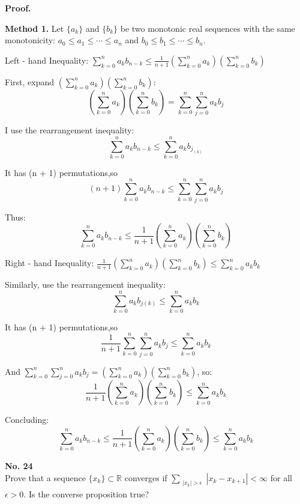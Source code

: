 \documentclass[a4paper, 11pt]{article}
\newenvironment{problem}[2][No.]
    { \begin{mdframed}[backgroundcolor=gray!5] \textbf{#1 #2} \\}
    {  \end{mdframed}}
\newenvironment{solution}
    {\textbf{Proof.}}
    {}
\begin{document}
\begin{solution}

\textbf{Method 1.} 
Let \(\{a_k\}\) and \(\{b_k\}\) be two monotonic real sequences with the same monotonicity: \(a_0\leq a_1\leq\cdots\leq a_n\) and \(b_0\leq b_1\leq\cdots\leq b_n\).  

Left - hand Inequality: \(\sum_{k = 0}^{n}a_k b_{n - k}\leq\frac{1}{n + 1}\left(\sum_{k = 0}^{n}a_k\right)\left(\sum_{k = 0}^{n}b_k\right)\) 
 
First, expand \(\left(\sum_{k = 0}^{n}a_k\right)\left(\sum_{k = 0}^{n}b_k\right)\):  
$$
\left(\sum_{k = 0}^{n}a_k\right)\left(\sum_{k = 0}^{n}b_k\right)=\sum_{k = 0}^{n}\sum_{j = 0}^{n}a_k b_j
$$ 

I use the rearrangement inequality:  
$$
\sum_{k = 0}^{n}a_k b_{n - k}\leq\sum_{k = 0}^{n}a_k b_{j_(k)}
$$

It has (n + 1) permutations,so 
$$
(n + 1)\sum_{k = 0}^{n}a_k b_{n - k}\leq\sum_{k = 0}^{n}\sum_{j = 0}^{n}a_k b_j
$$  

Thus:  
$$
\sum_{k = 0}^{n}a_k b_{n - k}\leq\frac{1}{n + 1}\left(\sum_{k = 0}^{n}a_k\right)\left(\sum_{k = 0}^{n}b_k\right)
$$  

Right - hand Inequality: \(\frac{1}{n + 1}\left(\sum_{k = 0}^{n}a_k\right)\left(\sum_{k = 0}^{n}b_k\right)\leq\sum_{k = 0}^{n}a_k b_k\)  

Similarly, use the rearrangement inequality:   
$$
\sum_{k = 0}^{n}a_k b_{j(k)}\leq\sum_{k = 0}^{n}a_k b_k
$$  

It has (n + 1) permutations,so 
$$
\frac{1}{n + 1}\sum_{k = 0}^{n}\sum_{j = 0}^{n}a_k b_j\leq\sum_{k = 0}^{n}a_k b_k
$$

And \(\sum_{k = 0}^{n}\sum_{j = 0}^{n}a_k b_j=\left(\sum_{k = 0}^{n}a_k\right)\left(\sum_{k = 0}^{n}b_k\right)\), so:  
$$
\frac{1}{n + 1}\left(\sum_{k = 0}^{n}a_k\right)\left(\sum_{k = 0}^{n}b_k\right)\leq\sum_{k = 0}^{n}a_k b_k
$$  
 
Concluding:  
$$
\sum_{k = 0}^{n}a_k b_{n - k}\leq\frac{1}{n + 1}\left(\sum_{k = 0}^{n}a_k\right)\left(\sum_{k = 0}^{n}b_k\right)\leq\sum_{k = 0}^{n}a_k b_k
$$  

\end{solution} 

\begin{problem}{24}
	Prove that a sequence $\{x_k\} \subset \mathbb{R}$ converges if $\sum_{\substack{|x_k| > \epsilon}} |x_k - x_{k + 1}| < \infty$ for all $\epsilon > 0$. Is the converse proposition true?
\end{problem}
\end{document}
